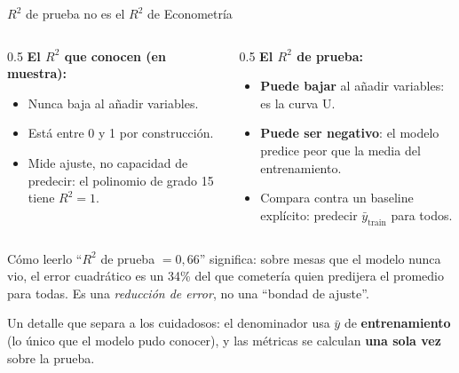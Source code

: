 \documentclass{beamer}
\newcommand{\1}{\mathbb{I}}
\begin{document}
\begin{frame}{$R^2$ de prueba no es el $R^2$ de Econometría}
\small
\begin{columns}[T]
\begin{column}{0.5\textwidth}
\textbf{El $R^2$ que conocen (en muestra):}
\begin{itemize}\itemsep3pt
  \item Nunca baja al añadir variables.
  \item Está entre 0 y 1 por construcción.
  \item Mide ajuste, no capacidad de predecir: el polinomio de grado 15 tiene $R^2 = 1$.
\end{itemize}
\end{column}
\begin{column}{0.5\textwidth}
\textbf{El $R^2$ de prueba:}
\begin{itemize}\itemsep3pt
  \item \textbf{Puede bajar} al añadir variables: es la curva U.
  \item \textbf{Puede ser negativo}: el modelo predice peor que la media del entrenamiento.
  \item Compara contra un baseline explícito: predecir $\bar{y}_{\text{train}}$ para todos.
\end{itemize}
\end{column}
\end{columns}
\pause
\vspace{0.25cm}
\begin{block}{Cómo leerlo}
``$R^2$ de prueba $= 0{,}66$'' significa: sobre mesas que el modelo nunca vio, el error cuadrático es un 34\% del que cometería quien predijera el promedio para todas. Es una \emph{reducción de error}, no una ``bondad de ajuste''.
\end{block}
\pause
\vspace{0.1cm}
Un detalle que separa a los cuidadosos: el denominador usa $\bar{y}$ de \textbf{entrenamiento} (lo único que el modelo pudo conocer), y las métricas se calculan \textbf{una sola vez} sobre la prueba.
\end{frame}
\end{document}
